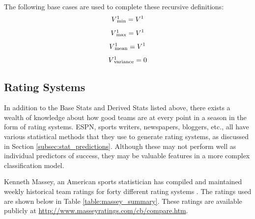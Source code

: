 \documentclass[]{article}
\def\SPSB#1#2{\rlap{\textsuperscript{#1}}\SB{#2}}
\def\SP#1{\textsuperscript{{#1}}}
\def\SB#1{\textsubscript{{#1}}}
\begin{document}
The following base cases are used to complete these recursive definitions:
\begin{equation}
	V\SPSB{1}{min} = V\SP{1}
\end{equation}
\begin{equation}
	V\SPSB{1}{max} = V\SP{1}
\end{equation}
\begin{equation}
	V\SPSB{1}{mean} = V\SP{1}
\end{equation}
\begin{equation}
	V\SPSB{1}{variance} = 0
\end{equation}

\subsection{Rating Systems}
In addition to the Base Stats and Derived Stats listed above, there exists a wealth of knowledge about how good teams are at every point in a season in the form of rating systems. ESPN, sports writers, newspapers, bloggers, etc., all have various statistical methods that they use to generate rating systems, as discussed in Section \ref{subsec:stat_predictions}. Although these may not perform well as individual predictors of success, they may be valuable features in a more complex classification model.

Kenneth Massey, an American sports statistician has compiled and maintained weekly historical team ratings for forty different rating systems \cite{massey}. The ratings used are shown below in Table \ref{table:massey_summary}. These ratings are available publicly at \url{http://www.masseyratings.com/cb/compare.htm}.
\end{document}

